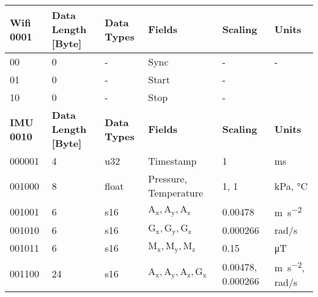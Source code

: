 \newpage
\begin{landscape}
\begin{table}[H]
	\centering
	\begin{tabular}{@{\makebox[3em][r]{\rownumber\space}}|llllll}
\hline
\textbf{Wifi 0001}   & \textbf{Data Length [Byte]} & \textbf{Data Types} & \textbf{Fields}             & \textbf{Scaling}   & \textbf{Units}                                    \\
\hline
00                   & 0                    & -                   & Sync                        & -                  & -                                                 \\
01                   & 0                    & -                   & Start                     &      -              &                                                   \\
10 &         0             &          -           & Stop               &      -              &                                                   \\
\hline
\textbf{IMU 0010}    & \textbf{Data Length [Byte]} & \textbf{Data Types} & \textbf{Fields}             & \textbf{Scaling}   & \textbf{Units}                                    \\
\hline
000001               & 4                    & u32                 & Timestamp                   & 1                  & ms                                                \\
001000               & 8                    & float               & Pressure, Temperature       & 1, 1               & kPa, \si{\degreeCelsius}                                         \\
001001               & 6                    & s16                 & $\mathrm{A_x, A_y, A_z}$                  & 0.00478            & \si{\meter \per \second \squared}               \\
001010               & 6                    & s16                 & $\mathrm{G_x, G_y, G_z}$                  & 0.000266           & rad/s                                             \\
001011               & 6                    & s16                 & $\mathrm{M_x, M_y, M_z}$                  & 0.15               & \si{\micro \tesla}                              \\
001100               & 24                   & s16                 & $\mathrm{A_x, A_y, A_z, G_x}$            & 0.00478,  0.000266 & \si{\meter \per \second \squared}, rad/s        \\

\end{tabular}
\end{table}
\end{landscape}
